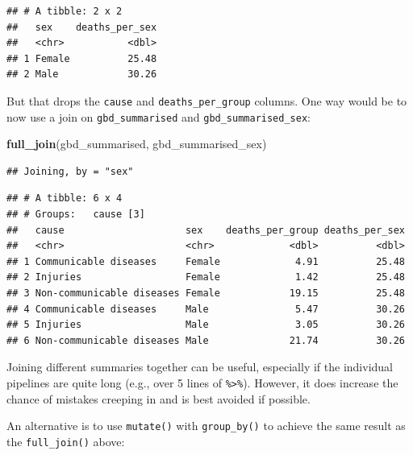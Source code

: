 \documentclass[
  12pt,
  krantz2]{krantz}
\makeatletter
\newenvironment{Shaded}{\begin{snugshade}}{\end{snugshade}}
\newcommand{\DataTypeTok}[1]{\textcolor[rgb]{0.13,0.29,0.53}{#1}}
\newcommand{\KeywordTok}[1]{\textcolor[rgb]{0.13,0.29,0.53}{\textbf{#1}}}
\newcommand{\NormalTok}[1]{#1}
\newcommand{\OperatorTok}[1]{\textcolor[rgb]{0.81,0.36,0.00}{\textbf{#1}}}
\newcommand{\StringTok}[1]{\textcolor[rgb]{0.31,0.60,0.02}{#1}}
\newenvironment{kframe}{%
\medskip{}
\setlength{\fboxsep}{.8em}
 \def\at@end@of@kframe{}%
 \ifinner\ifhmode%
  \def\at@end@of@kframe{\end{minipage}}%
  \begin{minipage}{\columnwidth}%
 \fi\fi%
 \def\FrameCommand##1{\hskip\@totalleftmargin \hskip-\fboxsep
 \colorbox{shadecolor}{##1}\hskip-\fboxsep
     \hskip-\linewidth \hskip-\@totalleftmargin \hskip\columnwidth}%
 \MakeFramed {\advance\hsize-\width
   \@totalleftmargin\z@ \linewidth\hsize
   \@setminipage}}%
 {\par\unskip\endMakeFramed%
 \at@end@of@kframe}
\renewenvironment{Shaded}{\begin{kframe}}{\end{kframe}}
\makeatother
\begin{document}
\begin{verbatim}
## # A tibble: 2 x 2
##   sex    deaths_per_sex
##   <chr>           <dbl>
## 1 Female          25.48
## 2 Male            30.26
\end{verbatim}

But that drops the \texttt{cause} and \texttt{deaths\_per\_group} columns.
One way would be to now use a join on \texttt{gbd\_summarised} and \texttt{gbd\_summarised\_sex}:

\begin{Shaded}
\begin{Highlighting}[]
\KeywordTok{full_join}\NormalTok{(gbd_summarised, gbd_summarised_sex)}
\end{Highlighting}
\end{Shaded}

\begin{verbatim}
## Joining, by = "sex"
\end{verbatim}

\begin{verbatim}
## # A tibble: 6 x 4
## # Groups:   cause [3]
##   cause                     sex    deaths_per_group deaths_per_sex
##   <chr>                     <chr>             <dbl>          <dbl>
## 1 Communicable diseases     Female             4.91          25.48
## 2 Injuries                  Female             1.42          25.48
## 3 Non-communicable diseases Female            19.15          25.48
## 4 Communicable diseases     Male               5.47          30.26
## 5 Injuries                  Male               3.05          30.26
## 6 Non-communicable diseases Male              21.74          30.26
\end{verbatim}

Joining different summaries together can be useful, especially if the individual pipelines are quite long (e.g., over 5 lines of \texttt{\%\textgreater{}\%}).
However, it does increase the chance of mistakes creeping in and is best avoided if possible.

An alternative is to use \texttt{mutate()} with \texttt{group\_by()} to achieve the same result as the \texttt{full\_join()} above:

\begin{Shaded}
\end{Shaded}
\end{document}
